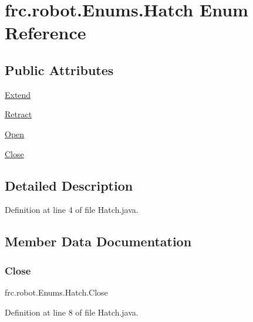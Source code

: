 \hypertarget{enumfrc_1_1robot_1_1_enums_1_1_hatch}{}\section{frc.\+robot.\+Enums.\+Hatch Enum Reference}
\label{enumfrc_1_1robot_1_1_enums_1_1_hatch}
\subsection*{Public Attributes}
\begin{DoxyCompactItemize}
\item 
\hyperlink{enumfrc_1_1robot_1_1_enums_1_1_hatch_aa9182f52be77e783bb38e7cfbf5bb700}{Extend}
\item 
\hyperlink{enumfrc_1_1robot_1_1_enums_1_1_hatch_ac4881a7e4ca2bc7c64aa8acd0da91d6e}{Retract}
\item 
\hyperlink{enumfrc_1_1robot_1_1_enums_1_1_hatch_aba378e125bbd0e4206aa27ab9bc51b0b}{Open}
\item 
\hyperlink{enumfrc_1_1robot_1_1_enums_1_1_hatch_ad9de6151d633f63ba3cb50aaeba1afd0}{Close}
\end{DoxyCompactItemize}


\subsection{Detailed Description}


Definition at line 4 of file Hatch.\+java.



\subsection{Member Data Documentation}
\mbox{\label{enumfrc_1_1robot_1_1_enums_1_1_hatch_ad9de6151d633f63ba3cb50aaeba1afd0}} 
\subsubsection{\texorpdfstring{Close}{Close}}
{\footnotesize\ttfamily frc.\+robot.\+Enums.\+Hatch.\+Close}



Definition at line 8 of file Hatch.\+java.

